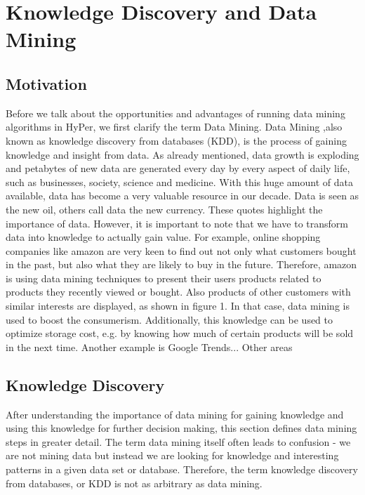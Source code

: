\chapter{Knowledge Discovery and Data Mining}\label{chapter:kdd}

\section{Motivation}
Before we talk about the opportunities and advantages of running data mining algorithms in HyPer, we first clarify the term Data Mining. Data Mining ,also known as knowledge discovery from databases (KDD), is the process of gaining knowledge and insight from data. As already mentioned, data growth is exploding and petabytes of new data are generated every day by every aspect of daily life, such as businesses, society, science and medicine. With this huge amount of data available, data has become a very valuable resource in our decade. Data is seen as the new oil, others call data the new currency. 
These quotes highlight the importance of data. However, it is important to note that we have to transform data into knowledge to actually gain value. For example, online shopping companies like amazon are very keen to find out not only what customers bought in the past, but also what they are likely to buy in the future. Therefore, amazon is using data mining techniques to present their users products related to products they recently viewed or bought. Also products of other customers with similar interests are displayed, as shown in figure 1. In that case, data mining is used to boost the consumerism. Additionally, this knowledge can be used to optimize storage cost, e.g. by knowing how much of certain products will be sold in the next time.
Another example is Google Trends...
Other areas


\section{Knowledge Discovery}

After understanding the importance of data mining for gaining knowledge and using this knowledge for further decision making, this section defines data mining steps in greater detail. The term data mining itself often leads to confusion - we are not mining data but instead we are looking for knowledge and interesting patterns in a given data set or database. Therefore, the term knowledge discovery from databases, or KDD is not as arbitrary as data mining.


